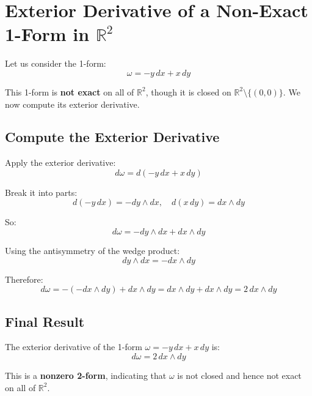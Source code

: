 \documentclass{article}
\begin{document}
 	
 	\section*{Exterior Derivative of a Non-Exact 1-Form in \(\mathbb{R}^2\)}
 	
 	Let us consider the 1-form:
 	\[
 	\omega = -y\,dx + x\,dy
 	\]
 	
 	This 1-form is \textbf{not exact} on all of \(\mathbb{R}^2\), though it is closed on \(\mathbb{R}^2 \setminus \{(0,0)\}\). We now compute its exterior derivative.
 	
 	\subsection*{Compute the Exterior Derivative}
 	
 	Apply the exterior derivative:
 	\[
 	d\omega = d(-y\,dx + x\,dy)
 	\]
 	
 	Break it into parts:
 	\[
 	d(-y\,dx) = -dy \wedge dx, \quad d(x\,dy) = dx \wedge dy
 	\]
 	
 	So:
 	\[
 	d\omega = -dy \wedge dx + dx \wedge dy
 	\]
 	
 	Using the antisymmetry of the wedge product:
 	\[
 	dy \wedge dx = -dx \wedge dy
 	\]
 	
 	Therefore:
 	\[
 	d\omega = -(-dx \wedge dy) + dx \wedge dy = dx \wedge dy + dx \wedge dy = 2\,dx \wedge dy
 	\]
 	
 	\subsection*{Final Result}
 	
 	The exterior derivative of the 1-form \( \omega = -y\,dx + x\,dy \) is:
 	\[
 	d\omega = 2\,dx \wedge dy
 	\]
 	
 	This is a \textbf{nonzero 2-form}, indicating that \( \omega \) is not closed and hence not exact on all of \(\mathbb{R}^2\).
 	
 
\end{document}
